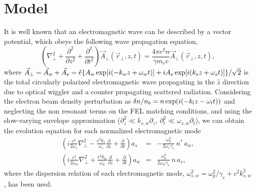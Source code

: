 \documentclass[aps,pra,preprint,showpacs,preprintnumbers,amsmath,amssymb]{revtex4-1}
\begin{document}
\section{Model}


It is well known that an electromagnetic wave can be described by a vector potential, which obeys the following  wave propagation equation,
\begin{equation}
\left( \nabla^2_\perp + \frac{\partial^2}{\partial z^2} + \frac{\partial^2}{\partial t^2}   \right) \vec{A}_\perp (\vec{r}_\perp, z,t) = \frac{4\pi e^2 n }{\gamma m_e c} \vec{A}_\perp(\vec{r}_\perp,z,t), 
\end{equation}
where $\vec{A}_\perp = \vec{A}_w + \vec{A}_s  = \hat{e} \{A_w \,\textnormal{exp}[i(-k_w z + \omega_w t )] + i A_s\, \textnormal{exp} [i(k_s z + \omega_s t )]  \}/\sqrt{2}$ is the total circularly polarized  electromagnetic wave propagating in the $\hat{z}$ direction due to optical  wiggler and a  counter propagating  scattered radiation.
Considering the electron beam density perturbation as $\delta n /n_b = n\,\textnormal{exp}(i(-k_l z- \omega_l t))$ and neglecting the non resonant terms on the FEL matching conditions, and using  the slow-varying envelope approximation ($\partial^2_z \ll k_{s,w} \partial_z$, $\partial^2_t \ll \omega_{s,w} \partial_t  $),  we can obtain the evolution equation for each normalized electromagnetic mode 
\begin{eqnarray}
\left( i \frac{c^2}{2\omega_s} \nabla^2_\perp - \frac{c^2 k_s}{\omega_s} \frac{\partial}{\partial z} + \frac{\partial}{\partial t} \right) a_s &=& -\frac{\omega_p^2}{2 \omega_s \gamma_e}\, n^*\, a_w,  \\ 
\left( i \frac{c^2}{2\omega_w} \nabla^2_\perp + \frac{c^2 k_w}{\omega_w} \frac{\partial}{\partial z} + \frac{\partial}{\partial t} \right) a_w &=& \frac{\omega_p^2}{2 \omega_w \gamma_e}\, n\, a_s,
\end{eqnarray}
where the dispersion relation of each electromagnetic mode,  $ \omega^{2}_{s,w} = \omega_p^2/\gamma_e + c^2 k^2_{s,w} $, has been used.
\end{document}
